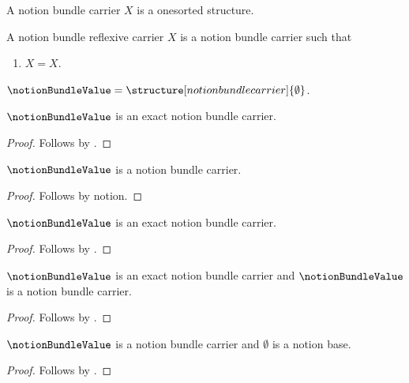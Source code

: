 

\begin{struct}\label{notion_bundle_carrier}
    A notion bundle carrier $X$ is a onesorted structure.
\end{struct}

\begin{struct}\label{notion_bundle_reflexive_carrier}
    A notion bundle reflexive carrier $X$ is a notion bundle carrier such that
    \begin{enumerate}
        \item\label{notion_bundle_reflexive_law} $X=X$.
    \end{enumerate}
\end{struct}

\begin{definition}\label{notion_bundle_value}
    $\notionBundleValue=\structure[notion bundle carrier]{\emptyset}$.
\end{definition}

\begin{classification}\label{notion_bundle_exact}
    $\notionBundleValue$ is an exact notion bundle carrier.
\end{classification}
\begin{proof}
    Follows by .
\end{proof}

\begin{proposition}\label{notion_bundle_open_replay}
    $\notionBundleValue$ is a notion bundle carrier.
\end{proposition}
\begin{proof}
    Follows by notion.
\end{proof}

\begin{proposition}\label{notion_bundle_exact_replay}
    $\notionBundleValue$ is an exact notion bundle carrier.
\end{proposition}
\begin{proof}
    Follows by .
\end{proof}

\begin{classification}\label{notion_bundle_nested}
    $\notionBundleValue$ is an exact notion bundle carrier and
    $\notionBundleValue$ is a notion bundle carrier.
\end{classification}
\begin{proof}
    Follows by .
\end{proof}

\begin{classification}\label{notion_bundle_mixed}
    $\notionBundleValue$ is a notion bundle carrier and
    $\emptyset$ is a notion base.
\end{classification}
\begin{proof}
    Follows by .
\end{proof}
